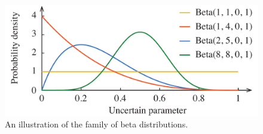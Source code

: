 \begin{figure}[t]
  \centering
  \includegraphics[width=1.0\columnwidth]{include/assets/figures/distribution.pdf}
  \caption{An illustration of the family of beta distributions.}
\end{figure}
